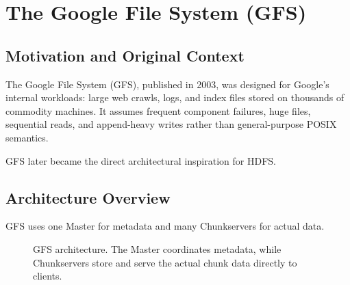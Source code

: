 \documentclass[11pt,a4paper,oneside]{book}
\begin{document}
\section{The Google File System (GFS)}

\subsection{Motivation and Original Context}

The Google File System (GFS), published in 2003, was designed for Google's internal workloads: large web crawls, logs, and index files stored on thousands of commodity machines. It assumes frequent component failures, huge files, sequential reads, and append-heavy writes rather than general-purpose POSIX semantics.

GFS later became the direct architectural inspiration for HDFS.

\subsection{Architecture Overview}

GFS uses one Master for metadata and many Chunkservers for actual data.

\begin{figure}[htbp]
\centering
{}
\caption{GFS architecture. The Master coordinates metadata, while Chunkservers store and serve the actual chunk data directly to clients.}
\label{fig:gfs-architecture}
\end{figure}
\end{document}

